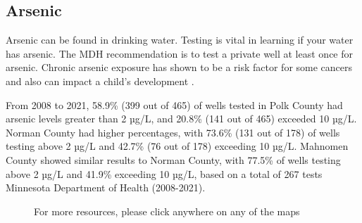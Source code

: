 \documentclass[
  a4paper,
  landscape]{scrreprt}
\begin{document}
\subsection{Arsenic}\label{arsenic}

Arsenic can be found in drinking water. Testing is vital in learning if
your water has arsenic. The MDH recommendation is to test a private well
at least once for arsenic. Chronic arsenic exposure has shown to be a
risk factor for some cancers and also can impact a child's development .

From 2008 to 2021, 58.9\% (399 out of 465) of wells tested in Polk
County had arsenic levels greater than 2 µg/L, and 20.8\% (141 out of
465) exceeded 10 µg/L. Norman County had higher percentages, with 73.6\%
(131 out of 178) of wells testing above 2 µg/L and 42.7\% (76 out of
178) exceeding 10 µg/L. Mahnomen County showed similar results to Norman
County, with 77.5\% of wells testing above 2 µg/L and 41.9\% exceeding
10 µg/L, based on a total of 267 tests Minnesota Department of Health
(2008-2021).

\begin{figure}[H]


\caption{\label{fig-privateWellsAs}For more resources, please click
anywhere on any of the maps}

\end{figure}%
\end{document}
